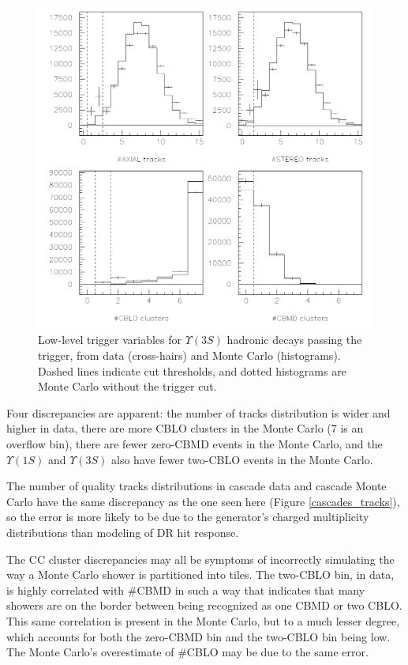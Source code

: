 \begin{figure}[p]
  \begin{center}
    \includegraphics[width=\linewidth]{plots/trigger_lowlevel_3s}
  \end{center}
  \caption{\label{trigger_lowlevel_3s} Low-level trigger variables for
    $\Upsilon(3S)$ hadronic decays passing the trigger, from data
    (cross-hairs) and Monte Carlo (histograms).  Dashed lines indicate
    cut thresholds, and dotted histograms are Monte Carlo without the
    trigger cut.}
\end{figure}

Four discrepancies are apparent: the number of tracks distribution is
wider and higher in data, there are more CBLO clusters in the Monte
Carlo (7 is an overflow bin), there are fewer zero-CBMD events in the
Monte Carlo, and the $\Upsilon(1S)$ and $\Upsilon(3S)$ also have fewer
two-CBLO events in the Monte Carlo.

The number of quality tracks distributions in cascade data and cascade
Monte Carlo have the same discrepancy as the one seen here (Figure
\ref{cascades_tracks}), so the error is more likely to be due to the
generator's charged multiplicity distributions than modeling of DR hit
response.

The CC cluster discrepancies may all be symptoms of incorrectly
simulating the way a Monte Carlo shower is partitioned into tiles.
The two-CBLO bin, in data, is highly correlated with \#CBMD in such a
way that indicates that many showers are on the border between being
recognized as one CBMD or two CBLO.  This same correlation is present
in the Monte Carlo, but to a much lesser degree, which accounts for
both the zero-CBMD bin and the two-CBLO bin being low.  The Monte
Carlo's overestimate of \#CBLO may be due to the same error.

